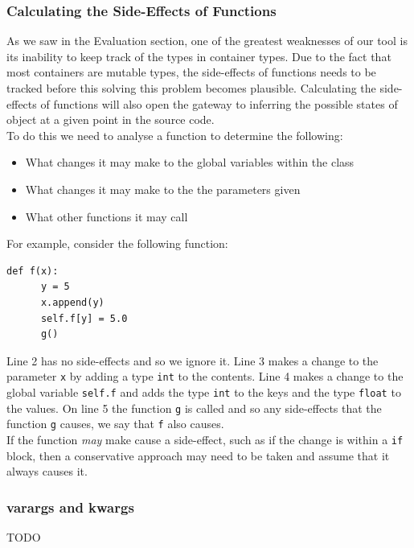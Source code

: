 \documentclass[12pt, titlepage]{article}
\begin{document}
\subsubsection*{Calculating the Side-Effects of Functions}
As we saw in the Evaluation section, one of the greatest weaknesses of our tool is its inability to keep track of the types in container types. Due to the fact that most containers are mutable types, the side-effects of functions needs to be tracked before this solving this problem becomes plausible. Calculating the side-effects of functions will also open the gateway to inferring the possible states of object at a given point in the source code. \\
\indent To do this we need to analyse a function to determine the following:
\begin{itemize}
	\item What changes it may make to the global variables within the class
	\item What changes it may make to the the parameters given
	\item What other functions it may call
\end{itemize}
For example, consider the following function:
\begin{lstlisting}[mathescape]
    def f(x):
      y = 5
      x.append(y)
      self.f[y] = 5.0
      g()
\end{lstlisting}
Line 2 has no side-effects and so we ignore it. Line 3 makes a change to the parameter \texttt{x} by adding a type \texttt{int} to the contents. Line 4 makes a change to the global variable \texttt{self.f} and adds the type \texttt{int} to the keys and the type \texttt{float} to the values. On line 5 the function \texttt{g} is called and so any side-effects that the function \texttt{g} causes, we say that \texttt{f} also causes. \\
\indent If the function \textit{may} make cause a side-effect, such as if the change is within a \texttt{if} block, then a conservative approach may need to be taken and assume that it always causes it.

\subsubsection*{varargs and kwargs}
TODO
\end{document}
